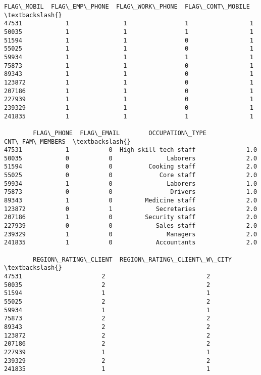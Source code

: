 \documentclass[11pt]{article}
\begin{document}
\begin{tcolorbox}[breakable, size=fbox, boxrule=.5pt, pad at break*=1mm, opacityfill=0]
\begin{Verbatim}[commandchars=\\\{\}]
        FLAG\_MOBIL  FLAG\_EMP\_PHONE  FLAG\_WORK\_PHONE  FLAG\_CONT\_MOBILE  \textbackslash{}
47531            1               1                1                 1
50035            1               1                1                 1
51594            1               1                0                 1
55025            1               1                0                 1
59934            1               1                1                 1
75873            1               1                0                 1
89343            1               1                0                 1
123872           1               1                0                 1
207186           1               1                0                 1
227939           1               1                0                 1
239329           1               1                0                 1
241835           1               1                1                 1

        FLAG\_PHONE  FLAG\_EMAIL        OCCUPATION\_TYPE  CNT\_FAM\_MEMBERS  \textbackslash{}
47531            1           0  High skill tech staff              1.0
50035            0           0               Laborers              2.0
51594            0           0          Cooking staff              2.0
55025            0           0             Core staff              2.0
59934            1           0               Laborers              1.0
75873            0           0                Drivers              1.0
89343            1           0         Medicine staff              2.0
123872           0           1            Secretaries              2.0
207186           1           0         Security staff              2.0
227939           0           0            Sales staff              2.0
239329           1           0               Managers              2.0
241835           1           0            Accountants              2.0

        REGION\_RATING\_CLIENT  REGION\_RATING\_CLIENT\_W\_CITY  \textbackslash{}
47531                      2                            2
50035                      2                            2
51594                      1                            1
55025                      2                            2
59934                      1                            1
75873                      2                            2
89343                      2                            2
123872                     2                            2
207186                     2                            2
227939                     1                            1
239329                     2                            2
241835                     1                            1


\end{Verbatim}
\end{tcolorbox}
\end{document}
